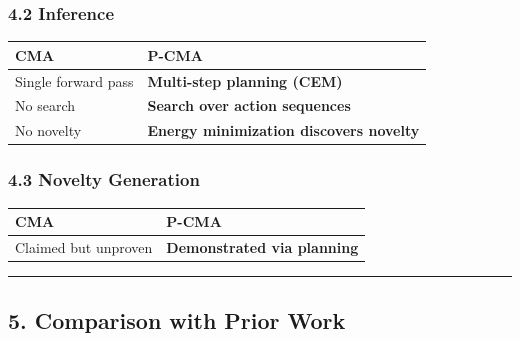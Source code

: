 \documentclass[
  11pt,
  a4paper,
]{article}
\begin{document}
\subsubsection{4.2 Inference}\label{inference}

\begin{longtable}[]{@{}ll@{}}
\toprule\noalign{}
CMA & \textbf{P-CMA} \\
\midrule\noalign{}
\endhead
\bottomrule\noalign{}
\endlastfoot
Single forward pass & \textbf{Multi-step planning (CEM)} \\
No search & \textbf{Search over action sequences} \\
No novelty & \textbf{Energy minimization discovers novelty} \\
\end{longtable}

\subsubsection{4.3 Novelty Generation}\label{novelty-generation}

\begin{longtable}[]{@{}ll@{}}
\toprule\noalign{}
CMA & \textbf{P-CMA} \\
\midrule\noalign{}
\endhead
\bottomrule\noalign{}
\endlastfoot
Claimed but unproven & \textbf{Demonstrated via planning} \\
\end{longtable}

\begin{center}\rule{0.5\linewidth}{0.5pt}\end{center}

\subsection{5. Comparison with Prior
Work}\label{comparison-with-prior-work}
\end{document}
